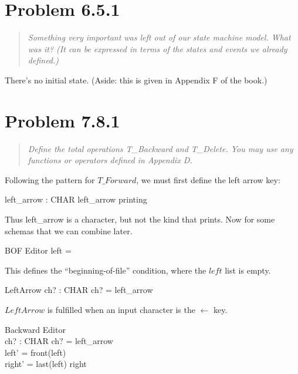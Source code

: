 \documentclass[11pt]{article}
\begin{document}
\section{Problem 6.5.1}
\begin{quote} \textit{
    Something very important was left out of our state machine model. What was it? (It can be
    expressed in terms of the states and events we already defined.)
  } \end{quote}

There's no initial state. (Aside: this is given in Appendix F of the book.)

\section{Problem 7.8.1}

\begin{quote}
  \textit{Define the total operations T\_Backward and T\_Delete.  You may use any functions or
    operators defined in Appendix D. }
\end{quote}

Following the pattern for $T\_Forward$, we must first define the left arrow key:

\begin{axdef}
  left\_arrow : CHAR
  \where
  left\_arrow \notin printing
\end{axdef}

Thus left\_arrow is a character, but not the kind that prints.  Now for some schemas that we can
combine later.

\begin{schema}{BOF}
  Editor
  \where
  left = \langle \rangle
\end{schema}

This defines the ``beginning-of-file'' condition, where the $left$ list is empty.

\begin{schema}{LeftArrow}
  ch? : CHAR
  \where
  ch? = left\_arrow
\end{schema}

$LeftArrow$ is fulfilled when an input character is the $\leftarrow$ key.  

\begin{schema}{Backward}
  \Delta Editor \\
  ch? : CHAR
  \where
  ch? = left\_arrow \\
  left' = front(left) \\
  right' = \langle last(left) \rangle \cat right
\end{schema}
\end{document}
